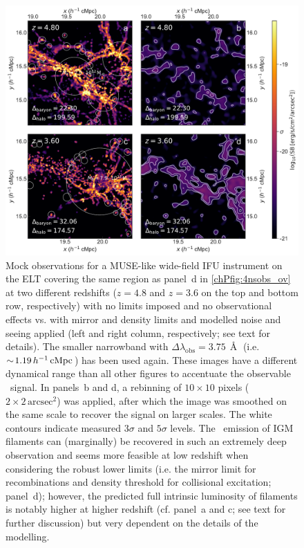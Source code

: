 \begin{figure}
    \centering
    \includegraphics[width=\linewidth]{"Plots/ChapterP/IFU_mock_observations"}
    \caption[Observed \lya\ surface brightness at $z=4.8$]
    {Mock observations for a MUSE-like wide-field IFU instrument on the ELT covering the same region as panel~d in \cref{chPfig:4nsobs_ov} at two different redshifts ($z=4.8$ and $z=3.6$ on the top and bottom row, respectively) with no limits imposed and no observational effects vs. with mirror and density limits and modelled noise and seeing applied (left and right column, respectively; see text for details). The smaller narrowband with $\Delta \lambda_\text{obs} = 3.75 \, \Angstrom$ (i.e. $\sim \! 1.19 \, h^{-1} \, \mathrm{cMpc}$) has been used again. These images have a different dynamical range than all other figures to accentuate the observable \lya\ signal. In panels~b and d, a rebinning of $10 \times 10$ pixels ($2 \times 2 \, \mathrm{arcsec}^2$) was applied, after which the image was smoothed on the same scale to recover the signal on larger scales. The white contours indicate measured $3 \sigma$ and $5 \sigma$ levels. The \lya\ emission of IGM filaments can (marginally) be recovered in such an extremely deep observation and seems more feasible at low redshift when considering the robust lower limits (i.e. the mirror limit for recombinations and density threshold for collisional excitation; panel~d); however, the predicted full intrinsic luminosity of filaments is notably higher at higher redshift (cf. panel~a and c; see text for further discussion) but very dependent on the details of the modelling.}
    \label{chPfig:4nsobs_ov150}
\end{figure}


